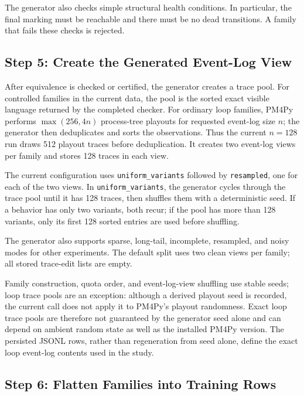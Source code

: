 \documentclass[manuscript,screen,nonacm]{acmart}
\begin{document}
The generator also checks simple structural health conditions. In particular,
the final marking must be reachable and there must be no dead transitions. A
family that fails these checks is rejected.

\subsection{Step 5: Create the Generated Event-Log View}
\label{app:create-log-view}

After equivalence is checked or certified, the generator creates a trace pool.
For controlled families in the current data, the pool is the sorted exact
visible language returned by the completed checker. For ordinary loop
families, PM4Py performs $\max(256,4n)$ process-tree playouts for requested event-log
size $n$; the generator then deduplicates and sorts the observations. Thus the
current $n=128$ run draws 512 playout traces before deduplication. It creates
two event-log views per family and stores 128 traces in each view.

The current configuration uses \texttt{uniform\_variants} followed by
\texttt{resampled}, one for each of the two views. In \texttt{uniform\_variants}, the generator cycles through the
trace pool until it has 128 traces, then shuffles them with a deterministic
seed. If a behavior has only two variants, both recur; if the pool has more
than 128 variants, only its first 128 sorted entries are used before shuffling.

The generator also supports sparse, long-tail, incomplete, resampled, and noisy
modes for other experiments. The default split uses two clean views per family;
all stored trace-edit lists are
empty.

Family construction, quota order, and event-log-view shuffling use stable seeds;
loop trace pools are an exception: although a derived playout seed is recorded,
the current call does not apply it to PM4Py's playout randomness. Exact loop
trace pools are therefore not guaranteed by the generator seed alone and can
depend on ambient random state as well as the installed PM4Py version. The
persisted JSONL rows, rather than regeneration from seed alone, define the exact
loop event-log contents used in the study.

\subsection{Step 6: Flatten Families into Training Rows}
\label{app:flatten-rows}
\end{document}
